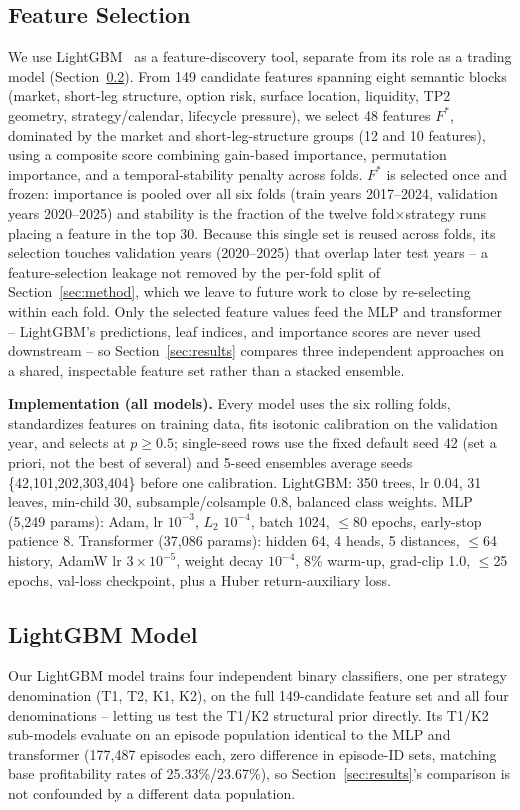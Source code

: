 \documentclass[sigconf,review]{acmart}
\begin{document}
\subsection{Feature Selection}
We use LightGBM~\cite{ke2017lightgbm} as a feature-discovery tool, separate from its role as a trading model (Section~\ref{sec:lgbm-scope}). From 149 candidate features spanning eight semantic blocks (market, short-leg structure, option risk, surface location, liquidity, TP2 geometry, strategy/calendar, lifecycle pressure), we select 48 features $F^{\ast}$, dominated by the market and short-leg-structure groups (12 and 10 features), using a composite score combining gain-based importance, permutation importance, and a temporal-stability penalty across folds. $F^{\ast}$ is selected once and frozen: importance is pooled over all six folds (train years 2017--2024, validation years 2020--2025) and stability is the fraction of the twelve fold$\times$strategy runs placing a feature in the top 30. Because this single set is reused across folds, its selection touches validation years (2020--2025) that overlap later test years -- a feature-selection leakage not removed by the per-fold split of Section~\ref{sec:method}, which we leave to future work to close by re-selecting within each fold. Only the selected feature values feed the MLP and transformer -- LightGBM's predictions, leaf indices, and importance scores are never used downstream -- so Section~\ref{sec:results} compares three independent approaches on a shared, inspectable feature set rather than a stacked ensemble.

\noindent\textbf{Implementation (all models).} Every model uses the six rolling folds, standardizes features on training data, fits isotonic calibration on the validation year, and selects at $p\ge0.5$; single-seed rows use the fixed default seed 42 (set a priori, not the best of several) and 5-seed ensembles average seeds \{42,101,202,303,404\} before one calibration. LightGBM: 350 trees, lr 0.04, 31 leaves, min-child 30, subsample/colsample 0.8, balanced class weights. MLP (5{,}249 params): Adam, lr $10^{-3}$, $L_2$ $10^{-4}$, batch 1024, $\le$80 epochs, early-stop patience 8. Transformer (37{,}086 params): hidden 64, 4 heads, 5 distances, $\le$64 history, AdamW lr $3{\times}10^{-5}$, weight decay $10^{-4}$, 8\% warm-up, grad-clip 1.0, $\le$25 epochs, val-loss checkpoint, plus a Huber return-auxiliary loss.

\subsection{LightGBM Model}
\label{sec:lgbm-scope}
Our LightGBM model trains four independent binary classifiers, one per strategy denomination (T1, T2, K1, K2), on the full 149-candidate feature set and all four denominations -- letting us test the T1/K2 structural prior directly. Its T1/K2 sub-models evaluate on an episode population identical to the MLP and transformer (177{,}487 episodes each, zero difference in episode-ID sets, matching base profitability rates of 25.33\%/23.67\%), so Section~\ref{sec:results}'s comparison is not confounded by a different data population.
\end{document}
